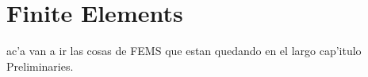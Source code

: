 \chapter{Finite Elements}
{\color{blue}ac'a van a ir las cosas de FEMS que estan quedando en el
largo cap'itulo Preliminaries.}